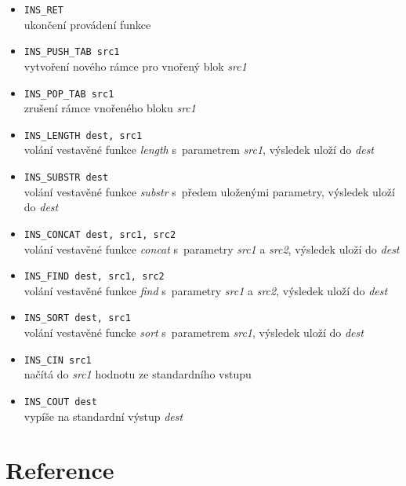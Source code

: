 \documentclass[a4paper, 12pt]{article}
\begin{document}
\begin{itemize}
	\item{\texttt{INS\_RET}} \\
	ukončení provádení funkce
	
	\item{\texttt{INS\_PUSH\_TAB src1}} \\
	vytvoření nového rámce pro vnořený blok \textit{src1}
	
	\item{\texttt{INS\_POP\_TAB src1}} \\
	zrušení rámce vnořeného bloku \textit{src1}
	
	\item{\texttt{INS\_LENGTH dest, src1}} \\
	volání vestavěné funkce \textit{length} s~parametrem \textit{src1}, výsledek uloží do \textit{dest}	
	
	\item{\texttt{INS\_SUBSTR dest}} \\
	volání vestavěné funkce \textit{substr} s~předem uloženými parametry, výsledek uloží do \textit{dest}
	
	\item{\texttt{INS\_CONCAT dest, src1, src2}} \\
	volání vestavěné funkce \textit{concat} s~parametry \textit{src1} a \textit{src2}, výsledek uloží do \textit{dest}
	
	\item{\texttt{INS\_FIND dest, src1, src2}} \\
	volání vestavěné funkce \textit{find} s~parametry \textit{src1} a \textit{src2}, výsledek uloží do \textit{dest}
	
	\item{\texttt{INS\_SORT dest, src1}} \\
	volání vestavěné funcke \textit{sort} s~parametrem \textit{src1}, výsledek uloží do \textit{dest}
	
	\item{\texttt{INS\_CIN src1}} \\
	načítá do \textit{src1} hodnotu ze standardního vstupu
	
	\item{\texttt{INS\_COUT dest}} \\
	vypíše na standardní výstup \textit{dest}
\end{itemize}

\section{Reference} \label{reference}
\end{document}
